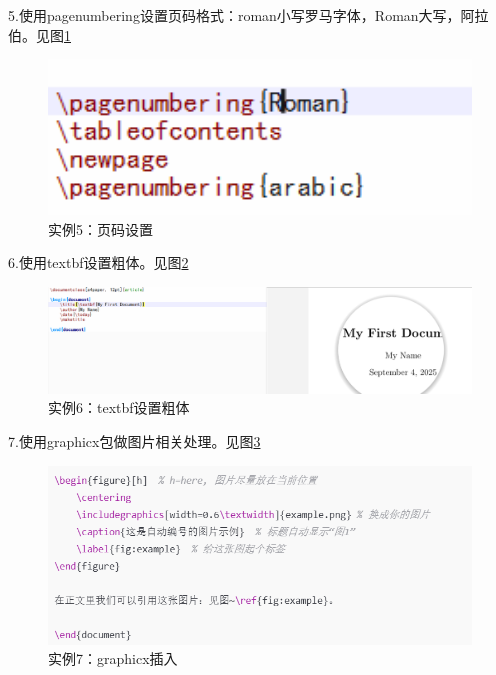 \documentclass{article}
\begin{document}
	5.使用pagenumbering设置页码格式：roman小写罗马字体，Roman大写，阿拉伯。见图\ref{fig:example7}
	
	\begin{figure}[h]  
		\centering
		\includegraphics[width=1\textwidth]{h.png}
		\caption{实例5：页码设置}
		\label{fig:example7}
	\end{figure}
	
	6.使用textbf设置粗体。见图\ref{fig:example8}
	
	\begin{figure}[h]  
		\centering
		\includegraphics[width=1\textwidth]{i.png}
		\caption{实例6：textbf设置粗体}
		\label{fig:example8}
	\end{figure}
	
	\newpage
	
	7.使用graphicx包做图片相关处理。见图\ref{fig:example9}
	
	\begin{figure}[h]  
		\centering
		\includegraphics[width=1\textwidth]{j.png}
		\caption{实例7：graphicx插入}
		\label{fig:example9}
	\end{figure}
	
\end{document}
